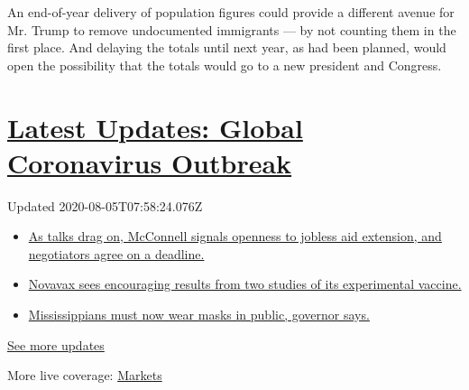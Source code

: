 An end-of-year delivery of population figures could provide a different
avenue for Mr. Trump to remove undocumented immigrants --- by not
counting them in the first place. And delaying the totals until next
year, as had been planned, would open the possibility that the totals
would go to a new president and Congress.

\hypertarget{latest-updates-global-coronavirus-outbreak}{%
\section{\texorpdfstring{\href{https://www.nytimes3xbfgragh.onion/2020/08/04/world/coronavirus-cases.html?action=click\&pgtype=Article\&state=default\&region=MAIN_CONTENT_1\&context=storylines_live_updates}{Latest
Updates: Global Coronavirus
Outbreak}}{Latest Updates: Global Coronavirus Outbreak}}\label{latest-updates-global-coronavirus-outbreak}}

Updated 2020-08-05T07:58:24.076Z

\begin{itemize}
\tightlist
\item
  \href{https://www.nytimes3xbfgragh.onion/2020/08/04/world/coronavirus-cases.html?action=click\&pgtype=Article\&state=default\&region=MAIN_CONTENT_1\&context=storylines_live_updates\#link-762df92}{As
  talks drag on, McConnell signals openness to jobless aid extension,
  and negotiators agree on a deadline.}
\item
  \href{https://www.nytimes3xbfgragh.onion/2020/08/04/world/coronavirus-cases.html?action=click\&pgtype=Article\&state=default\&region=MAIN_CONTENT_1\&context=storylines_live_updates\#link-1228a480}{Novavax
  sees encouraging results from two studies of its experimental
  vaccine.}
\item
  \href{https://www.nytimes3xbfgragh.onion/2020/08/04/world/coronavirus-cases.html?action=click\&pgtype=Article\&state=default\&region=MAIN_CONTENT_1\&context=storylines_live_updates\#link-794484ed}{Mississippians
  must now wear masks in public, governor says.}
\end{itemize}

\href{https://www.nytimes3xbfgragh.onion/2020/08/04/world/coronavirus-cases.html?action=click\&pgtype=Article\&state=default\&region=MAIN_CONTENT_1\&context=storylines_live_updates}{See
more updates}

More live coverage:
\href{https://www.nytimes3xbfgragh.onion/live/2020/08/04/business/stock-market-today-coronavirus?action=click\&pgtype=Article\&state=default\&region=MAIN_CONTENT_1\&context=storylines_live_updates}{Markets}

